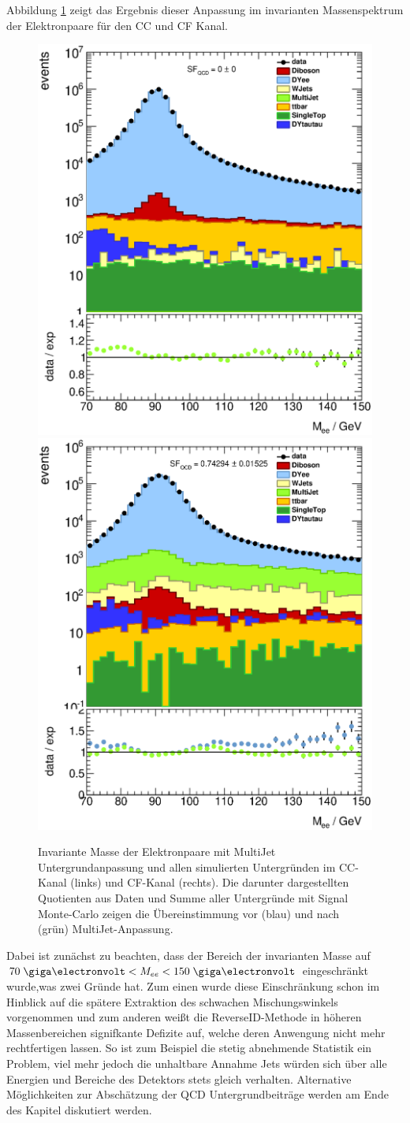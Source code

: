 Abbildung \ref{fig:multijet} zeigt das Ergebnis dieser Anpassung im invarianten
Massenspektrum der Elektronpaare für den \ac{CC} und \ac{CF} Kanal.
\begin{figure}[h]
    \centering
    \includegraphics[width=.48\textwidth]{plots/mee_cc}
    \hfill
    \includegraphics[width=.48\textwidth]{plots/mee_cf}
    \caption[Invariante Masse der Elektronpaare nach MultiJet
        Untergrundanpassung]
        {Invariante Masse der Elektronpaare mit MultiJet Untergrundanpassung
        und allen simulierten Untergründen im \ac{CC}-Kanal (links) und
        \ac{CF}-Kanal (rechts). Die darunter dargestellten Quotienten aus Daten
        und Summe aller Untergründe mit Signal Monte-Carlo zeigen die
        Übereinstimmung vor (blau) und nach (grün) MultiJet-Anpassung.}
    \label{fig:multijet}
\end{figure}
Dabei ist zunächst zu beachten, dass der Bereich der invarianten Masse auf
$70\GeV < M_{ee} < 150\GeV$ eingeschränkt wurde,was zwei Gründe hat. Zum einen
wurde diese Einschränkung schon im Hinblick auf die spätere Extraktion des
schwachen Mischungswinkels vorgenommen und zum anderen weißt die
ReverseID-Methode in höheren Massenbereichen signifkante Defizite auf, welche
deren Anwengung nicht mehr rechtfertigen lassen. So ist zum Beispiel die stetig
abnehmende Statistik ein Problem, viel mehr jedoch die unhaltbare Annahme Jets
würden sich über alle Energien und Bereiche des Detektors stets gleich
verhalten. Alternative Möglichkeiten zur Abschätzung der \ac{QCD}
Untergrundbeiträge werden am Ende des Kapitel diskutiert werden.


